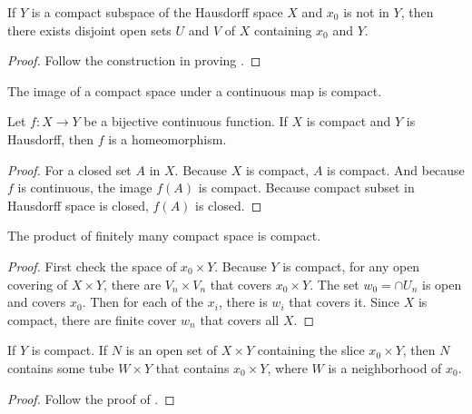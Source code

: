 \begin{theorem}\label{disjoint_openset_of_x_and_compact_set}
    If $Y$ is a compact subspace of the Hausdorff space $X$ and $x_0$ is not in $Y$, then there exists disjoint open sets $U$ and $V$ of $X$ containing $x_0$ and $Y$.    
\end{theorem}
\begin{proof}
    Follow the construction in proving .
\end{proof}

\begin{theorem}
    The image of a compact space under a continuous map is compact.    
\end{theorem}

\begin{theorem}
    Let $f: X \rightarrow Y$ be a bijective continuous function. If $X$ is compact and $Y$ is Hausdorff, then $f$ is a homeomorphism.
\end{theorem}
\begin{proof}
    For a closed set $A$ in $X$. Because $X$ is compact, $A$ is compact. And because $f$ is continuous, the image $f(A)$ is compact. Because compact subset in Hausdorff space is closed, $f(A)$ is closed.
\end{proof}

\begin{theorem}\label{finite_product_of_compact_space}
    The product of finitely many compact space is compact.
\end{theorem}
\begin{proof}
    First check the space of $x_0 \times Y$. Because $Y$ is compact, for any open covering of $X \times Y$, there are $V_n \times V_n$ that covers $x_0 \times Y$. The set $w_0 = \cap U_n$ is open and covers $x_0$. Then for each of the $x_i$, there is $w_i$ that covers it. Since $X$ is compact, there are finite cover $w_n$ that covers all $X$.
\end{proof}

\begin{theorem}
    If $Y$ is compact. If $N$ is an open set of $X \times Y$ containing the slice $x_0 \times Y$, then $N$ contains some tube $W \times Y$ that contains $x_0 \times Y$, where $W$ is a neighborhood of $x_0$.
\end{theorem}
\begin{proof}
    Follow the proof of .
\end{proof}

